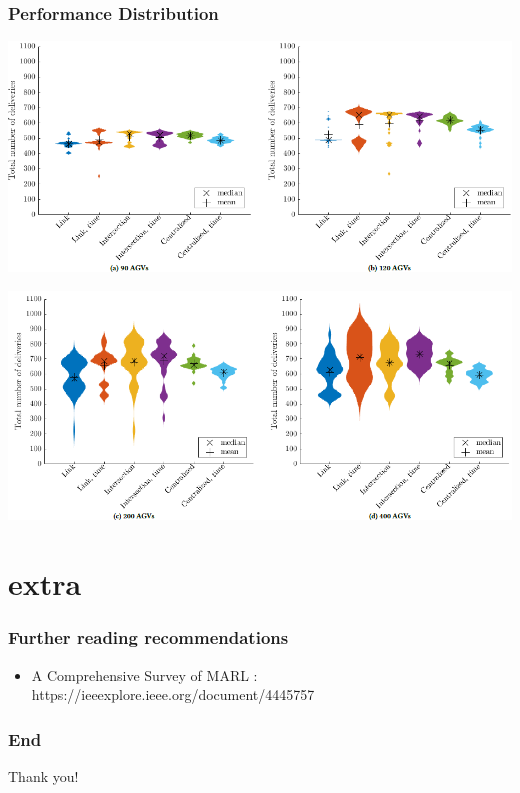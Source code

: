 \documentclass{beamer}
\begin{document}
	\begin{frame}
	\frametitle{Performance Distribution}
	\begin{center}
    \includegraphics[height=0.425\textheight ]{violin1.png}
    
    
     \includegraphics[height=0.425\textheight]{violin2.png}
     \end{center}
	\end{frame}
	
	\section{extra}
	\begin{frame}
	\frametitle{Further reading recommendations}
		\begin{itemize}
			\item A Comprehensive Survey of MARL : https://ieeexplore.ieee.org/document/4445757
		\end{itemize}
	\end{frame}
	\begin{frame}
	\frametitle{End}
    Thank you!
	\end{frame}
\end{document}
